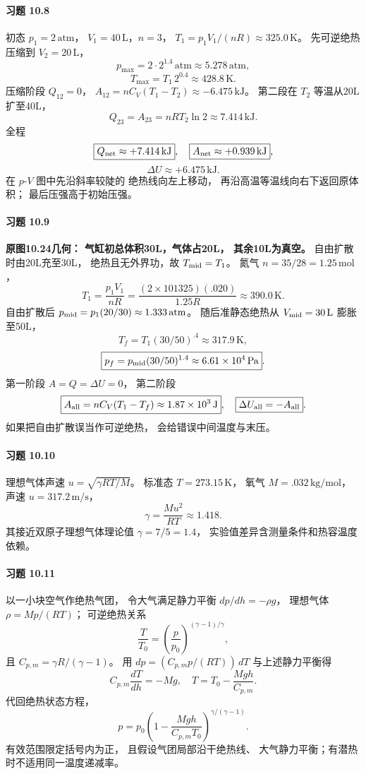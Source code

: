 \paragraph{习题 10.8}
初态
\(p_1=2\,\mathrm{atm}\)，
\(V_1=40\,\mathrm L\)，\(n=3\)，
\(T_1=p_1V_1/(nR)\approx325.0\,\mathrm K\)。
先可逆绝热压缩到
\(V_2=20\,\mathrm L\)，
\[
 \boxed{p_{\max}=2\cdot2^{1.4}\,\mathrm{atm}
 \approx5.278\,\mathrm{atm}},
\]
\[
 \boxed{T_{\max}=T_1\,2^{0.4}
 \approx428.8\,\mathrm K}.
\]
压缩阶段
\(Q_{12}=0\)，
\(A_{12}=nC_V(T_1-T_2)
 \approx-6.475\,\mathrm{kJ}\)。
第二段在 \(T_2\) 等温从20L扩至40L，
\[
 \boxed{Q_{23}=A_{23}=nRT_2\ln2
 \approx7.414\,\mathrm{kJ}}.
\]
全程
\[
 \boxed{Q_{\rm net}\approx+7.414\,\mathrm{kJ}},
\quad
 \boxed{A_{\rm net}\approx+0.939\,\mathrm{kJ}},
\]
\[
 \boxed{\Delta U\approx+6.475\,\mathrm{kJ}}.
\]
在 \(p\)-\(V\) 图中先沿斜率较陡的
绝热线向左上移动，
再沿高温等温线向右下返回原体积；
最后压强高于初始压强。

\paragraph{习题 10.9}
\textbf{原图10.24几何：
气缸初总体积30L，气体占20L，
其余10L为真空。}
自由扩散时由20L充至30L，
绝热且无外界功，故
\(T_{\rm mid}=T_1\)。
氮气 \(n=35/28=1.25\,\mathrm{mol}\)，
\[
 T_1=\frac{p_1V_1}{nR}
 =\frac{(2\times101325)(.020)}{1.25R}
 \approx390.0\,\mathrm K.
\]
自由扩散后
\(p_{\rm mid}=p_1(20/30)
 \approx1.333\,\mathrm{atm}\)。
随后准静态绝热从
\(V_{\rm mid}=30\,\mathrm L\)
膨胀至50L，
\[
 \boxed{T_f=T_1(30/50)^{.4}
 \approx317.9\,\mathrm K},
\]
\[
 \boxed{p_f=p_{\rm mid}(30/50)^{1.4}
 \approx6.61\times10^4\,\mathrm{Pa}}.
\]
第一阶段 \(A=Q=\Delta U=0\)，
第二阶段
\[
 \boxed{A_{\rm all}=nC_V(T_1-T_f)
 \approx1.87\times10^3\,\mathrm J},\quad
 \boxed{\Delta U_{\rm all}=-A_{\rm all}}.
\]
如果把自由扩散误当作可逆绝热，
会给错误中间温度与末压。

\paragraph{习题 10.10}
理想气体声速
\(u=\sqrt{\gamma RT/M}\)。
标准态 \(T=273.15\,\mathrm K\)，
氧气 \(M=.032\,\mathrm{kg/mol}\)，
声速 \(u=317.2\,\mathrm{m/s}\)，
\[
 \boxed{\gamma=\frac{Mu^2}{RT}
 \approx1.418}.
\]
其接近双原子理想气体理论值
\(\gamma=7/5=1.4\)，
实验值差异含测量条件和热容温度依赖。

\paragraph{习题 10.11}
以一小块空气作绝热气团，
令大气满足静力平衡
\(dp/dh=-\rho g\)，
理想气体 \(\rho=Mp/(RT)\)；
可逆绝热关系
\[
 \frac{T}{T_0}
 =\left(\frac p{p_0}\right)^{(\gamma-1)/\gamma},
\]
且 \(C_{p,m}=\gamma R/(\gamma-1)\)。
用 \(dp=(C_{p,m}p/(RT))\,dT\)
与上述静力平衡得
\[
 C_{p,m}\frac{dT}{dh}=-Mg,
\quad
 T=T_0-\frac{Mgh}{C_{p,m}}.
\]
代回绝热状态方程，
\[
 \boxed{p=p_0\left(
 1-\frac{Mgh}{C_{p,m}T_0}
 \right)^{\gamma/(\gamma-1)}}.
\]
有效范围限定括号内为正，
且假设气团局部沿干绝热线、
大气静力平衡；有潜热时不适用同一温度递减率。

